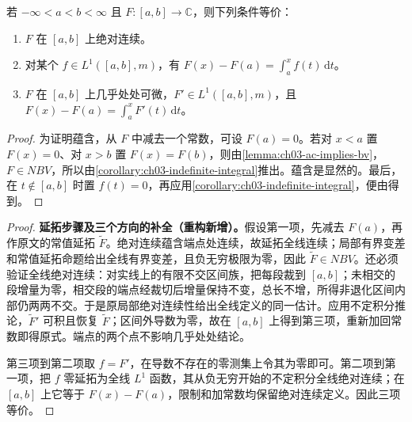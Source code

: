 \documentclass[../../main.tex]{subfiles}%
\begin{document}
\begin{theorem}\label{theorem:ch03-fundamental-calculus}
若 $-\infty<a<b<\infty$ 且 $F:[a,b]\to\mathbb C$，则下列条件等价：
\begin{enumerate}
\item\label{item:ch03-ftc-ac} $F$ 在 $[a,b]$ 上绝对连续。
\item\label{item:ch03-ftc-integral} 对某个 $f\in L^1([a,b],m)$，有 $F(x)-F(a)=\int_a^xf(t)\,\mathrm dt$。
\item\label{item:ch03-ftc-derivative} $F$ 在 $[a,b]$ 上几乎处处可微，$F'\in L^1([a,b],m)$，且 $F(x)-F(a)=\int_a^xF'(t)\,\mathrm dt$。
\end{enumerate}
\end{theorem}
\begin{proof}
为证明蕴含，从 $F$ 中减去一个常数，可设 $F(a)=0$。若对 $x<a$ 置 $F(x)=0$、对 $x>b$ 置 $F(x)=F(b)$，则由\cref{lemma:ch03-ac-implies-bv}，$F\in NBV$，所以由\cref{corollary:ch03-indefinite-integral}推出。蕴含是显然的。最后，在 $t\notin[a,b]$ 时置 $f(t)=0$，再应用\cref{corollary:ch03-indefinite-integral}，便由得到。
\end{proof}
\begin{proof}
\textbf{延拓步骤及三个方向的补全（重构新增）。}假设第一项，先减去 $F(a)$，再作原文的常值延拓 $\widetilde F$。绝对连续蕴含端点处连续，故延拓全线连续；局部有界变差和常值延拓命题给出全线有界变差，且负无穷极限为零，因此 $\widetilde F\in NBV$。还必须验证全线绝对连续：对实线上的有限不交区间族，把每段裁到 $[a,b]$；未相交的段增量为零，相交段的端点经裁切后增量保持不变，总长不增，所得非退化区间内部仍两两不交。于是原局部绝对连续性给出全线定义的同一估计。应用不定积分推论，$\widetilde F'$ 可积且恢复 $\widetilde F$；区间外导数为零，故在 $[a,b]$ 上得到第三项，重新加回常数即得原式。端点的两个点不影响几乎处处结论。

第三项到第二项取 $f=F'$，在导数不存在的零测集上令其为零即可。第二项到第一项，把 $f$ 零延拓为全线 $L^1$ 函数，其从负无穷开始的不定积分全线绝对连续；在 $[a,b]$ 上它等于 $F(x)-F(a)$，限制和加常数均保留绝对连续定义。因此三项等价。
\end{proof}
\end{document}
